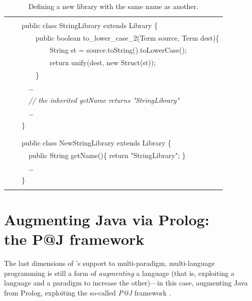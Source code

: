\begin{table}
    \begin{center}{\tt
    \begin{tabular}{p{13.5cm}}\hline
    \\
    \mbox{~~~~}public class StringLibrary extends Library \{\\
    \mbox{~~~~~~~~}public boolean to\_lower\_case\_2(Term source, Term dest)\{\\
    \mbox{~~~~~~~~~~~~}String st = source.toString().toLowerCase();\\
    \mbox{~~~~~~~~~~~~}return unify(dest, new Struct(st));\\
    \mbox{~~~~~~~~}\}\\
    \mbox{~~~~~~}\ldots\\
    \mbox{~~~~~~}\textit{// the inherited getName returns "StringLibrary"}\\
    \mbox{~~~~~~}\ldots\\
    \mbox{~~~~}\}\\
    \\
    \hline
    \\
    \mbox{~~~~}public class NewStringLibrary extends Library \{\\
    \mbox{~~~~~~}public String getName()\{ return "StringLibrary"; \}\\
    \mbox{~~~~~~}\ldots\\
    \mbox{~~~~}\}\\
    \\
    \hline
    \end{tabular}
    }\end{center}
    \caption{Defining a new library with the same name as another.}
    \label{tab:StringLibrary-NewStringLibrary}
\end{table}


\section{Augmenting Java via Prolog:\\the P@J framework}
\label{sec:p@j}

The last dimensions of \tuprolog{}'s support to multi-paradigm, multi-language programming is still a form of \textit{augmenting} a language (that is, exploiting a language and a paradigm to increase the other)---in this case, augmenting Java from Prolog, exploiting the so-called \textit{P@J} framework \cite{short-patj-sac08}.

